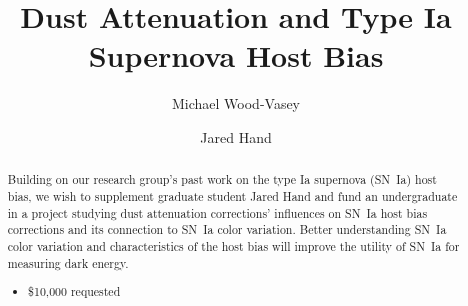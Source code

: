 \documentclass[modern]{aastex63}
\begin{document}
\title{Dust Attenuation and Type Ia Supernova Host Bias}


\author{Michael Wood-Vasey}

\author{Jared Hand}

\begin{abstract}
    Building on our research group's past work on the type Ia supernova (SN~Ia) host bias, we wish to supplement graduate student Jared Hand and fund an undergraduate in a project studying dust attenuation corrections' influences on SN~Ia host bias corrections and its connection to SN~Ia color variation. Better understanding SN~Ia color variation and characteristics of the host bias will improve the utility of SN~Ia for measuring dark energy.
    \begin{itemize}
        \item \$10,000 requested
    \end{itemize}
\end{abstract}
\end{document}

